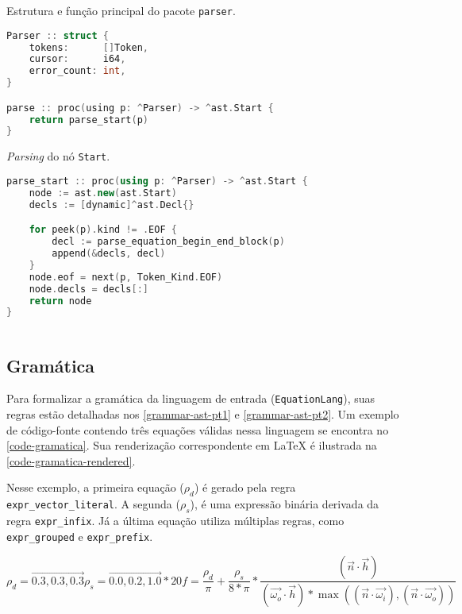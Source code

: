 \begin{codigo}[htb]
    \caption{\small Estrutura e função principal do pacote \texttt{parser}. }
        \label{cod-func-and-structs}
  \begin{lstlisting}[language = C]
Parser :: struct {
    tokens:      []Token,
    cursor:      i64,
    error_count: int,
}

parse :: proc(using p: ^Parser) -> ^ast.Start {
    return parse_start(p)
}
  \end{lstlisting}
\end{codigo}

\begin{codigo}[htb]
    \caption{\small \textit{Parsing} do nó \texttt{Start}. }
        \label{cod-parsing-start}
  \begin{lstlisting}[language=C++]
parse_start :: proc(using p: ^Parser) -> ^ast.Start {
    node := ast.new(ast.Start)
    decls := [dynamic]^ast.Decl{}

    for peek(p).kind != .EOF {
        decl := parse_equation_begin_end_block(p)
        append(&decls, decl)
    }
    node.eof = next(p, Token_Kind.EOF)
    node.decls = decls[:]
    return node
}
    
  \end{lstlisting}
\end{codigo}



\subsection{Gramática}


Para formalizar a gramática da linguagem de entrada (\texttt{EquationLang}), suas regras estão detalhadas nos \autoref{grammar-ast-pt1} e \autoref{grammar-ast-pt2}. Um exemplo de código-fonte contendo três equações válidas nessa linguagem se encontra no \autoref{code-gramatica}. Sua renderização correspondente em \LaTeX{} é ilustrada na \autoref{code-gramatica-rendered}.

Nesse exemplo, a primeira equação ($\rho_{d}$) é gerado pela regra \verb"expr_vector_literal". A segunda ($\rho_{s}$), é uma expressão binária derivada da regra \verb"expr_infix". Já a última equação utiliza múltiplas regras, como \verb"expr_grouped" e \verb"expr_prefix".


\begin{subequations}
\label{code-gramatica-rendered} 
\begin{equation}
    \rho_{d} = \vec{0.3,0.3,0.3}
\end{equation}
\begin{equation}
    \rho_{s} = \vec{0.0,0.2,1.0} * 20
\end{equation}
\begin{equation}
f = \frac{\rho_{d}}{\pi} + \frac{\rho_{s}}{8*\pi} * \frac{({\vec{n}}\cdot{\vec{h}})} {({\vec{\omega_{o}}}\cdot{\vec{h}}) * \max(({\vec{n}}\cdot{\vec{\omega_{i}}}), ({\vec{n}}\cdot{\vec{\omega_{o}}}))}
\end{equation}
\end{subequations}


